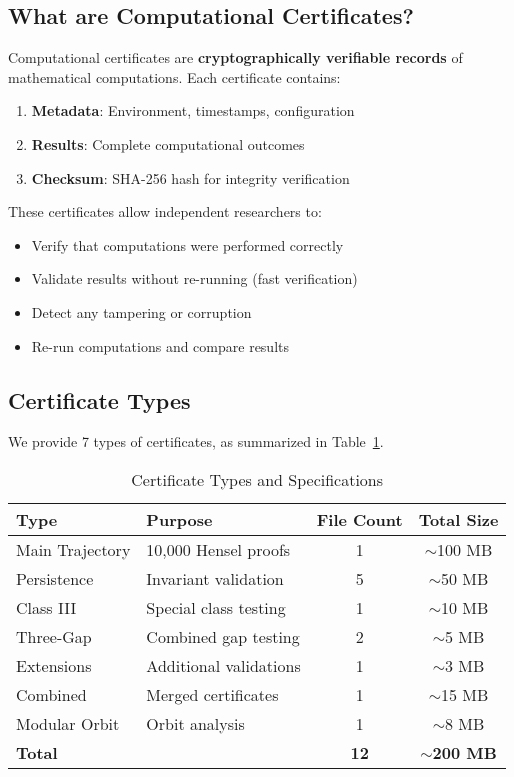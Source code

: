\documentclass[11pt,a4paper]{article}
\theoremstyle{definition}
\begin{document}
\subsection{What are Computational Certificates?}

Computational certificates are \textbf{cryptographically verifiable records} of mathematical computations. Each certificate contains:

\begin{enumerate}
    \item \textbf{Metadata}: Environment, timestamps, configuration
    \item \textbf{Results}: Complete computational outcomes
    \item \textbf{Checksum}: SHA-256 hash for integrity verification
\end{enumerate}

\begin{infobox}[title={Benefits of Computational Certificates}]
These certificates allow independent researchers to:
\begin{itemize}
    \item[\ding{51}] Verify that computations were performed correctly
    \item[\ding{51}] Validate results without re-running (fast verification)
    \item[\ding{51}] Detect any tampering or corruption
    \item[\ding{51}] Re-run computations and compare results
\end{itemize}
\end{infobox}

\subsection{Certificate Types}

We provide 7 types of certificates, as summarized in Table~\ref{tab:certificate_types}.

\begin{table}[H]
\centering
\caption{Certificate Types and Specifications}
\label{tab:certificate_types}
\begin{tabular}{@{}llcc@{}}
\toprule
\textbf{Type} & \textbf{Purpose} & \textbf{File Count} & \textbf{Total Size} \\
\midrule
Main Trajectory & 10,000 Hensel proofs & 1 & $\sim$100 MB \\
Persistence & Invariant validation & 5 & $\sim$50 MB \\
Class III & Special class testing & 1 & $\sim$10 MB \\
Three-Gap & Combined gap testing & 2 & $\sim$5 MB \\
Extensions & Additional validations & 1 & $\sim$3 MB \\
Combined & Merged certificates & 1 & $\sim$15 MB \\
Modular Orbit & Orbit analysis & 1 & $\sim$8 MB \\
\midrule
\textbf{Total} & & \textbf{12} & \textbf{$\sim$200 MB} \\
\bottomrule
\end{tabular}
\end{table}
\end{document}
